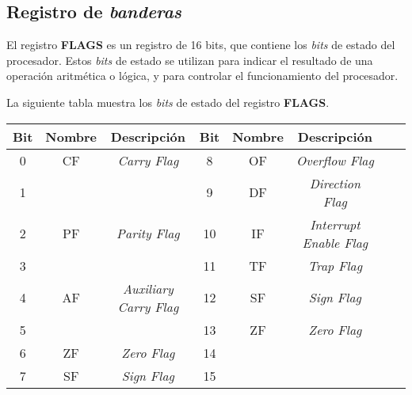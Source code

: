 \documentclass{article}
\begin{document}
\subsection*{Registro de \textit{banderas}}
El registro \textbf{FLAGS} es un registro de 16 bits, que contiene los \textit{bits} de estado
del procesador. Estos \textit{bits} de estado se utilizan para indicar el resultado de una
operaci\'{o}n aritm\'{e}tica o l\'{o}gica, y para controlar el funcionamiento del procesador.

\begin{flushleft}
    La siguiente tabla muestra los \textit{bits} de estado del registro \textbf{FLAGS}.
\end{flushleft}
\medbreak

\begin{tabular}{|c|c|c|c|c|c|c|c|}
    \hline
    \textbf{Bit} & \textbf{Nombre} & \textbf{Descripci\'{o}n}      & \textbf{Bit} & \textbf{Nombre} & \textbf{Descripci\'{o}n}       \\
    \hline
    0            & CF              & \textit{Carry Flag}           & 8            & OF              & \textit{Overflow Flag}         \\
    \hline
    1            &                 &                               & 9            & DF              & \textit{Direction Flag}        \\
    \hline
    2            & PF              & \textit{Parity Flag}          & 10           & IF              & \textit{Interrupt Enable Flag} \\
    \hline
    3            &                 &                               & 11           & TF              & \textit{Trap Flag}             \\
    \hline
    4            & AF              & \textit{Auxiliary Carry Flag} & 12           & SF              & \textit{Sign Flag}             \\
    \hline
    5            &                 &                               & 13           & ZF              & \textit{Zero Flag}             \\
    \hline
    6            & ZF              & \textit{Zero Flag}            & 14           &                 &                                \\
    \hline
    7            & SF              & \textit{Sign Flag}            & 15           &                 &                                \\
    \hline
\end{tabular}
\end{document}
